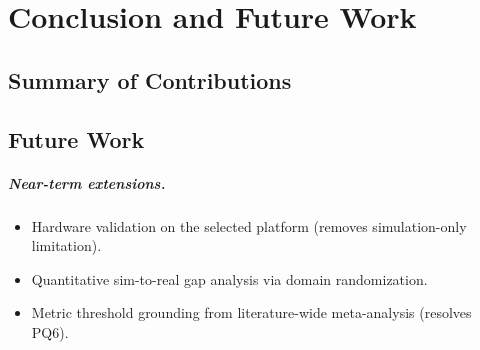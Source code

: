
\chapter{Conclusion and Future Work}
\label{chap:conclusion}

\section{Summary of Contributions}
\label{sec:summary}


\lipsum[47]

\begin{criticalinsight}
\end{criticalinsight}

\section{Future Work}
\label{sec:future}


\paragraph{Near-term extensions.}
\begin{itemize}
  \item Hardware validation on the selected platform (removes simulation-only limitation).
  \item Quantitative sim-to-real gap analysis via domain randomization.
  \item Metric threshold grounding from literature-wide meta-analysis (resolves PQ6).
\end{itemize}

